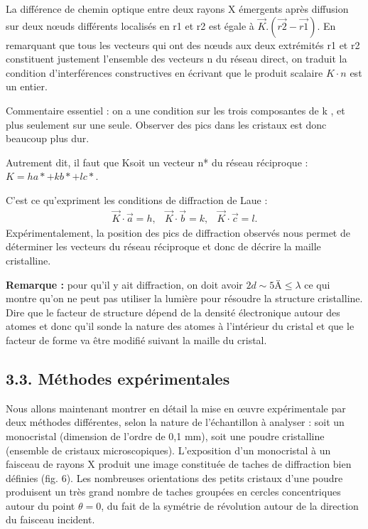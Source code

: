 \documentclass[french, a4paper, 10pt, twocolumn, landscape]{article}
\begin{document}
La différence de chemin optique entre deux rayons X émergents après diffusion sur deux nœuds différents localisés en r1 et r2 est égale à $\vec{K}.(\vec{r2}- \vec{r1})$. En remarquant que tous les vecteurs qui ont des nœuds aux deux extrémités r1 et r2 constituent justement l'ensemble des vecteurs n du réseau direct, on traduit la condition d'interférences constructives en écrivant que le produit scalaire $K\cdot n$ est un entier.

Commentaire essentiel : on
a une condition sur les trois composantes de k , et plus seulement
sur une seule. Observer des pics dans les cristaux est donc beaucoup
plus dur.

Autrement dit, il faut que Ksoit un vecteur n* du réseau réciproque : $K= h a* + k b* + l c*$.

C'est ce qu'expriment les conditions de diffraction de Laue :
\begin{equation}
    \begin{array}{ccc}
    \vec{K}\cdot \vec{a} = h, &\vec{K}\cdot \vec{b} = k, & \vec{K}\cdot \vec{c} = l.
\end{array}
\end{equation}
Expérimentalement, la position des pics de diffraction observés nous permet de déterminer les vecteurs du réseau réciproque et donc de décrire la maille cristalline.


\textbf{Remarque :} pour qu'il y ait diffraction, on doit avoir $2d\sim 5 Ä\leq\lambda$ ce qui montre qu'on ne peut pas utiliser la lumière pour résoudre la structure cristalline.\\

Dire que le facteur de structure dépend de la densité électronique autour des atomes et donc qu'il sonde la nature des atomes à l'intérieur du cristal et que le facteur de forme va être modifié suivant la maille du cristal.

\subsection*{3.3. Méthodes expérimentales}

Nous allons maintenant montrer en détail la mise en œuvre expérimentale par deux méthodes différentes, selon la nature de l'échantillon à analyser : soit un monocristal (dimension de l'ordre de 0,1 mm), soit une poudre cristalline (ensemble de cristaux microscopiques). L'exposition d'un monocristal à un faisceau de rayons X produit une image constituée de taches de diffraction bien définies (fig. 6). Les nombreuses orientations des petits cristaux d'une poudre produisent un très grand nombre de taches groupées en cercles concentriques autour du point $\theta = 0$, du fait de la symétrie de révolution autour de la direction du faisceau incident. \medskip
\end{document}
